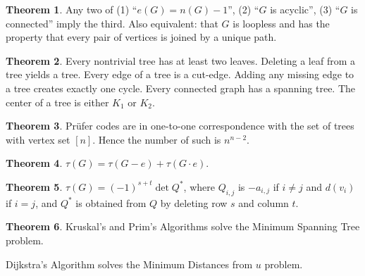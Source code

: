 \documentclass{article}
\theoremstyle{definition}
\newtheorem{theorem}{Theorem}
\begin{document}
\begin{theorem}
Any two of (1) ``$e(G)=n(G)-1$'', (2) ``$G$ is acyclic'', (3) ``$G$ is connected'' imply the third.  Also equivalent: that $G$ is loopless and has the property that every pair of vertices is joined by a unique path.
\end{theorem}
\begin{theorem}
Every nontrivial tree has at least two leaves.  Deleting a leaf from a tree yields a tree.  Every edge of a tree is a cut-edge.  Adding any missing edge to a tree creates exactly one cycle.  Every connected graph has a spanning tree.  The center of a tree is either $K_1$ or $K_2$.
\end{theorem}

\begin{theorem}
Pr\"ufer codes are in one-to-one correspondence with the set of trees with vertex set $[n]$.  Hence the number of such is $n^{n-2}$.
\end{theorem}
\begin{theorem}
$\tau(G)=\tau(G-e)+\tau(G\cdot e)$.
\end{theorem}
\begin{theorem}
$\tau(G)=(-1)^{s+t}\det Q^*$, where $Q_{i,j}$ is $-a_{i,j}$ if $i\neq j$ and $d(v_i)$ if $i=j$, and $Q^*$ is obtained from $Q$ by deleting row $s$ and column $t$. 
\end{theorem}

\begin{theorem}
Kruskal's and Prim's Algorithms solve the Minimum Spanning Tree problem.

Dijkstra's Algorithm solves the Minimum Distances from $u$ problem.
\end{theorem}
\end{document}
